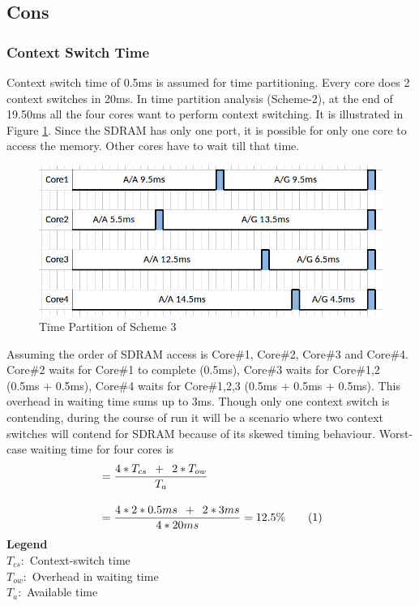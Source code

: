 \subsection{Cons}
\label{mm:cons}
\subsubsection{Context Switch Time}
Context switch time of 0.5ms is assumed for time partitioning. Every core does 2 context switches in 20ms. In time partition analysis (Scheme-2), at the end of 19.50ms all the four cores want to perform context switching. It is illustrated in Figure \ref{fig:mm:mm_cons1}. Since the SDRAM has only one port, it is possible for only one core to access the memory. Other cores have to wait till that time. 

\begin{figure}[h!]
	\centering
	\includegraphics[width=120mm]{figures/mm_cons1}
	\caption{Time Partition of Scheme 3}
	\label{fig:mm:mm_cons1}
\end{figure}

Assuming the order of SDRAM access is Core\#1, Core\#2, Core\#3 and Core\#4. Core\#2 waits for Core\#1 to complete (0.5ms), Core\#3 waits for Core\#1,2 (0.5ms + 0.5ms), Core\#4 waits for Core\#1,2,3 (0.5ms + 0.5ms + 0.5ms). This overhead in waiting time sums up to 3ms. Though only one context switch is contending, during the course of run it will be a scenario where two context switches will contend for SDRAM because of its skewed timing behaviour. Worst-case waiting time for four cores is 
\begin{align*}
	& = \frac{4*T_{cs} \enspace + \enspace 2*T_{ow}}{T_{a}} \\[0.4cm]
	& = \frac{4*2*0.5ms \enspace + \enspace 2*3ms}{4*20ms} = 12.5\% \stepcounter{equation}\tag{\theequation} 
\end{align*}
\noindent
\textbf{Legend} \\
\tab $T_{cs}:$ Context-switch time \\
\tab $T_{ow}:$ Overhead in waiting time \\
\tab $T_{a}:$ Available time \\

